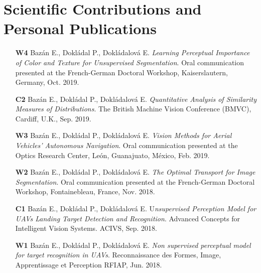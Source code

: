 
\chapter*{Scientific Contributions and Personal Publications}\label{ch:publications}

\begin{itemize}
    \item [\textbf{W4}] Bazán E., Dokládal P., Dokládalová E. \textit{Learning Perceptual Importance of Color and Texture for Unsupervised Segmentation}. Oral communication presented at the French-German Doctoral Workshop, Kaiserslautern, Germany, Oct. 2019.
    \item [\textbf{C2}] Bazán E., Dokládal P., Dokládalová E. \textit{Quantitative Analysis of Similarity Measures of Distributions}. The British Machine Vision Conference (BMVC), Cardiff, U.K., Sep. 2019.
    \item [\textbf{W3}] Bazán E., Dokládal P., Dokládalová E. \textit{Vision Methods for Aerial Vehicles’ Autonomous Navigation}. Oral communication presented at the Optics Research Center, León, Guanajuato, México, Feb. 2019.
    \item [\textbf{W2}] Bazán E., Dokládal P., Dokládalová E. \textit{The Optimal Transport for Image Segmentation}. Oral communication presented at the French-German Doctoral Workshop, Fontainebleau, France, Nov. 2018.
    \item [\textbf{C1}] Bazán E., Dokládal P., Dokládalová E. U\textit{nsupervised Perception Model for UAVs Landing Target Detection and Recognition}. Advanced Concepts for Intelligent Vision Systems. ACIVS,  Sep. 2018.
    \item [\textbf{W1}] Bazán E., Dokládal P., Dokládalová E. \textit{Non supervised perceptual model for target recognition in UAVs}. Reconnaissance des Formes, Image, Apprentissage et Perception RFIAP, Jun. 2018.
\end{itemize}
